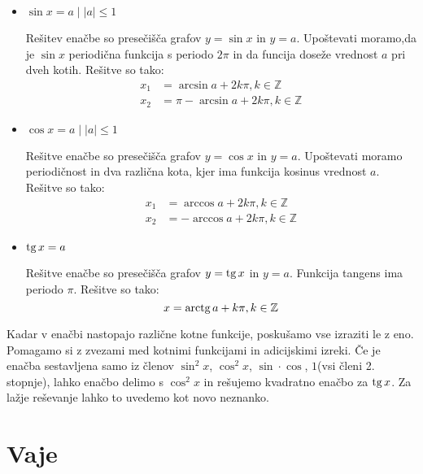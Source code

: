 \begin{itemize}
\item $\sin x=a \mid |a|\le 1$

Rešitev enačbe so presečišča grafov $y=\sin x$ in $y=a$. Upoštevati moramo,da je $\sin x$ periodična funkcija s periodo $2\pi$ in da funcija doseže vrednost $a$ pri dveh kotih. Rešitve so tako:
\begin{align*}
x_1&= \arcsin a + 2k\pi, k\in \mathbb{Z} \\
x_2&= \pi -\arcsin a + 2k\pi, k\in \mathbb{Z}
\end{align*}

\item $\cos x=a \mid |a|\le 1$

Rešitve enačbe so presečišča grafov $y=\cos x$ in $y=a$. Upoštevati moramo periodičnost in dva različna kota, kjer ima funkcija kosinus vrednost $a$. Rešitve so tako:
\begin{align*}
x_1&= \arccos a + 2k\pi, k\in \mathbb{Z} \\
x_2&= -\arccos a + 2k\pi, k\in \mathbb{Z}
\end{align*}

\item $\operatorname{tg} x =a$

Rešitve enačbe so presečišča grafov $y=\operatorname{tg} x$ in $y=a$. Funkcija tangens ima periodo $\pi$. Rešitve so tako:
\begin{equation*}
x= \operatorname{arctg} a +k\pi, k \in \mathbb{Z}
\end{equation*}
\end{itemize}

Kadar v enačbi nastopajo različne kotne funkcije, poskušamo vse izraziti le z eno. Pomagamo si z zvezami med kotnimi funkcijami in adicijskimi izreki. Če je enačba sestavljena samo iz členov $\sin^2x$, $\cos^2x$, $\sin\cdot\cos$, $1$(vsi členi 2. stopnje), lahko enačbo delimo s $\cos^2x$ in rešujemo kvadratno enačbo za $\operatorname{tg} x$. Za lažje reševanje lahko to uvedemo kot novo neznanko. 


\section{Vaje}
\label{sec:sin-cos-vaje}


\def\datotekaOdgovori{odgovori-sincos}

